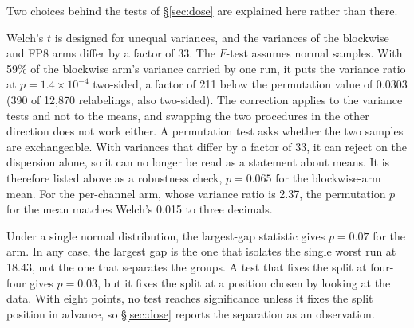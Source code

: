 \documentclass[11pt,letterpaper]{article}
\begin{document}
Two choices behind the tests of \S\ref{sec:dose} are explained here rather
than there.

\medskip
Welch's $t$ is designed for unequal variances, and the variances of the blockwise and FP8 arms differ by a factor of 33. The $F$-test assumes normal samples. With 59\% of the blockwise arm's variance carried by one run, it puts the variance ratio at $p = 1.4\times10^{-4}$ two-sided, a factor of 211 below the permutation value of $0.0303$ (390 of 12{,}870 relabelings, also two-sided). The correction applies to the variance tests and not to the means, and swapping the two procedures in the other direction does not work either. A permutation test asks whether the two samples are exchangeable. With variances that differ by a factor of 33, it can reject on the dispersion alone, so it can no longer be read as a statement about means. It is therefore listed above as a robustness check, $p = 0.065$ for the blockwise-arm mean. For the per-channel arm, whose variance ratio is 2.37, the permutation $p$ for the mean matches Welch's 0.015 to three decimals.

\medskip
Under a single normal distribution, the largest-gap statistic gives $p = 0.07$ for the arm. In any case, the largest gap is the one that isolates the single worst run at 18.43, not the one that separates the groups. A test that fixes the split at four-four gives $p = 0.03$, but it fixes the split at a position chosen by looking at the data. With eight points, no test reaches significance unless it fixes the split position in advance, so \S\ref{sec:dose} reports the separation as an observation.
\end{document}
